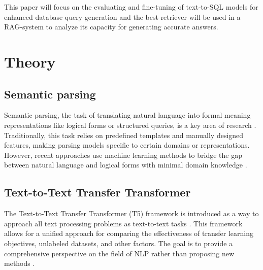 \documentclass[11pt]{article}
\begin{document}
This paper will focus on the evaluating and fine-tuning of text-to-SQL models for enhanced database query generation and the best retriever will be used in a RAG-system to analyze its capacity for generating accurate answers.

\section{Theory}
\subsection{Semantic parsing}

Semantic parsing, the task of translating natural language into formal meaning representations like logical forms or structured queries, is a key area of research \cite{dong2016language}. Traditionally, this task relies on predefined templates and manually designed features, making parsing models specific to certain domains or representations. However, recent approaches use machine learning methods to bridge the gap between natural language and logical forms with minimal domain knowledge \cite{dong2016language}.

\subsection{Text-to-Text Transfer Transformer}

The Text-to-Text Transfer Transformer (T5) framework is introduced as a way to approach all text processing problems as text-to-text tasks \cite{TextTTextTransformer}. This framework allows for a unified approach for comparing the effectiveness of transfer learning objectives, unlabeled datasets, and other factors. The goal is to provide a comprehensive perspective on the field of NLP rather than proposing new methods \cite{dong2016language}.
\end{document}
